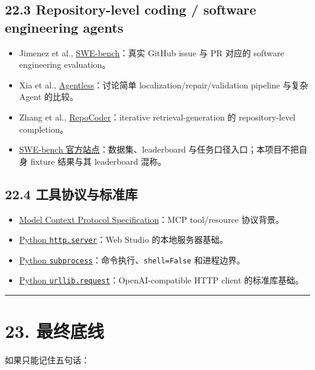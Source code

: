 \documentclass[UTF8,12pt,openany]{ctexbook}
\begin{document}
\subsection{22.3 Repository-level coding / software engineering agents}

\begin{itemize}
\item Jimenez et al., \href{https://arxiv.org/abs/2310.06770}{SWE-bench}：真实 GitHub issue 与 PR 对应的 software engineering evaluation。
\item Xia et al., \href{https://arxiv.org/abs/2407.01489}{Agentless}：讨论简单 localization/repair/validation pipeline 与复杂 Agent 的比较。
\item Zhang et al., \href{https://arxiv.org/abs/2303.12570}{RepoCoder}：iterative retrieval-generation 的 repository-level completion。
\item \href{https://www.swebench.com/}{SWE-bench 官方站点}：数据集、leaderboard 与任务口径入口；本项目不把自身 fixture 结果与其 leaderboard 混称。
\end{itemize}

\subsection{22.4 工具协议与标准库}

\begin{itemize}
\item \href{https://modelcontextprotocol.io/specification}{Model Context Protocol Specification}：MCP tool/resource 协议背景。
\item \href{https://docs.python.org/3/library/http.server.html}{Python \texttt{http.server}}：Web Studio 的本地服务器基础。
\item \href{https://docs.python.org/3/library/subprocess.html}{Python \texttt{subprocess}}：命令执行、\texttt{shell=False} 和进程边界。
\item \href{https://docs.python.org/3/library/urllib.request.html}{Python \texttt{urllib.request}}：OpenAI-compatible HTTP client 的标准库基础。
\end{itemize}

\hrule

\section{23. 最终底线}

如果只能记住五句话：\par
\end{document}
